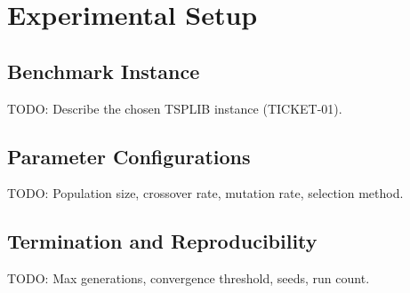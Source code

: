 \chapter{Experimental Setup}
\label{Chapter5}

\section{Benchmark Instance}
\label{Sec:Benchmark}
TODO: Describe the chosen TSPLIB instance (TICKET-01).

\section{Parameter Configurations}
\label{Sec:Parameters}
TODO: Population size, crossover rate, mutation rate, selection method.

\section{Termination and Reproducibility}
\label{Sec:Termination}
TODO: Max generations, convergence threshold, seeds, run count.
